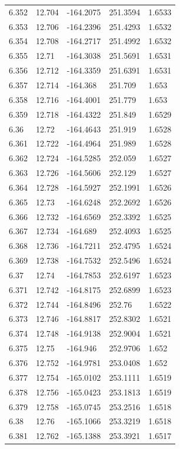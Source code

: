 \begin{tabular}{lllll}
6.352 & 12.704 & -164.2075 & 251.3594 & 1.6533 \\
6.353 & 12.706 & -164.2396 & 251.4293 & 1.6532 \\
6.354 & 12.708 & -164.2717 & 251.4992 & 1.6532 \\
6.355 & 12.71 & -164.3038 & 251.5691 & 1.6531 \\
6.356 & 12.712 & -164.3359 & 251.6391 & 1.6531 \\
6.357 & 12.714 & -164.368 & 251.709 & 1.653 \\
6.358 & 12.716 & -164.4001 & 251.779 & 1.653 \\
6.359 & 12.718 & -164.4322 & 251.849 & 1.6529 \\
6.36 & 12.72 & -164.4643 & 251.919 & 1.6528 \\
6.361 & 12.722 & -164.4964 & 251.989 & 1.6528 \\
6.362 & 12.724 & -164.5285 & 252.059 & 1.6527 \\
6.363 & 12.726 & -164.5606 & 252.129 & 1.6527 \\
6.364 & 12.728 & -164.5927 & 252.1991 & 1.6526 \\
6.365 & 12.73 & -164.6248 & 252.2692 & 1.6526 \\
6.366 & 12.732 & -164.6569 & 252.3392 & 1.6525 \\
6.367 & 12.734 & -164.689 & 252.4093 & 1.6525 \\
6.368 & 12.736 & -164.7211 & 252.4795 & 1.6524 \\
6.369 & 12.738 & -164.7532 & 252.5496 & 1.6524 \\
6.37 & 12.74 & -164.7853 & 252.6197 & 1.6523 \\
6.371 & 12.742 & -164.8175 & 252.6899 & 1.6523 \\
6.372 & 12.744 & -164.8496 & 252.76 & 1.6522 \\
6.373 & 12.746 & -164.8817 & 252.8302 & 1.6521 \\
6.374 & 12.748 & -164.9138 & 252.9004 & 1.6521 \\
6.375 & 12.75 & -164.946 & 252.9706 & 1.652 \\
6.376 & 12.752 & -164.9781 & 253.0408 & 1.652 \\
6.377 & 12.754 & -165.0102 & 253.1111 & 1.6519 \\
6.378 & 12.756 & -165.0423 & 253.1813 & 1.6519 \\
6.379 & 12.758 & -165.0745 & 253.2516 & 1.6518 \\
6.38 & 12.76 & -165.1066 & 253.3219 & 1.6518 \\
6.381 & 12.762 & -165.1388 & 253.3921 & 1.6517 \\

\end{tabular}
